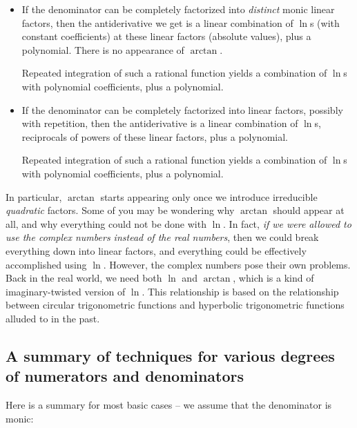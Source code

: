 \documentclass[10pt]{amsart}
\begin{document}
\begin{itemize}
\item If the denominator can be completely factorized into {\em
  distinct} monic linear factors, then the antiderivative we get is a
  linear combination of $\ln$s (with constant coefficients) at these
  linear factors (absolute values), plus a polynomial. There is no
  appearance of $\arctan$.

  Repeated integration of such a rational function yields a
  combination of $\ln$s with polynomial coefficients, plus a
  polynomial.
\item If the denominator can be completely factorized into linear
  factors, possibly with repetition, then the antiderivative is a
  linear combination of $\ln$s, reciprocals of powers of these
  linear factors, plus a polynomial.

  Repeated integration of such a rational function yields a
  combination of $\ln$s with polynomial coefficients, plus a
  polynomial.
\end{itemize}

In particular, $\arctan$ starts appearing only once we introduce
irreducible {\em quadratic} factors. Some of you may be wondering why
$\arctan$ should appear at all, and why everything could not be done
with $\ln$. In fact, {\em if we were allowed to use the complex
numbers instead of the real numbers}, then we could break everything
down into linear factors, and everything could be effectively
accomplished using $\ln$. However, the complex numbers pose their own
problems. Back in the real world, we need both $\ln$ and $\arctan$,
which is a kind of imaginary-twisted version of $\ln$. This
relationship is based on the relationship between circular
trigonometric functions and hyperbolic trigonometric functions alluded
to in the past.

\subsection{A summary of techniques for various degrees of numerators and denominators}

Here is a summary for most basic cases -- we assume that the
denominator is monic:
\end{document}
